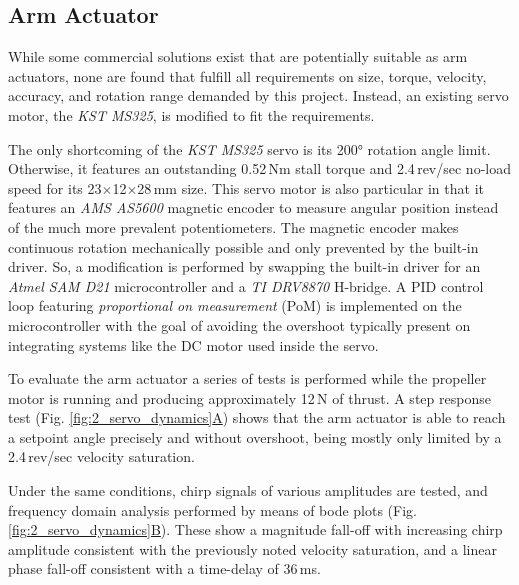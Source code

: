 \documentclass[conference]{IEEEtran}
\newcommand{\txtapprox}{\raisebox{0.5ex}{\texttildelow}}
\begin{document}
\subsection{Arm Actuator}
While some commercial solutions exist that are potentially suitable as arm actuators, none are found that fulfill all requirements on size, torque, velocity, accuracy, and rotation range demanded by this project. Instead, an existing servo motor, the \textit{KST MS325}, is modified to fit the requirements. 
\par
The only shortcoming of the \textit{KST MS325} servo is its 200° rotation angle limit. Otherwise, it features an outstanding 0.52\,Nm stall torque and 2.4\,rev/sec no-load speed for its 23$\times$12$\times$28\,mm size. This servo motor is also particular in that it features an \textit{AMS AS5600} magnetic encoder to measure angular position instead of the much more prevalent potentiometers. The magnetic encoder makes continuous rotation mechanically possible and only prevented by the built-in driver. So, a modification is performed by swapping the built-in driver for an \textit{Atmel SAM D21} microcontroller and a \textit{TI DRV8870} H-bridge. A PID control loop featuring \textit{proportional on measurement} (PoM) \cite{2017_beauregard_pom} is implemented on the microcontroller with the goal of avoiding the overshoot typically present on integrating systems like the DC motor used inside the servo.
\par
To evaluate the arm actuator a series of tests is performed while the propeller motor is running and producing approximately 12\,N of thrust. A step response test (Fig. \hyperref[fig:2_servo_dynamics]{\ref*{fig:2_servo_dynamics}A}) shows that the arm actuator is able to reach a setpoint angle precisely and without overshoot, being mostly only limited by a \txtapprox2.4\,rev/sec velocity saturation. 
\par
Under the same conditions, chirp signals of various amplitudes are tested, and frequency domain analysis performed by means of bode plots (Fig. \hyperref[fig:2_servo_dynamics]{\ref*{fig:2_servo_dynamics}B}). These show a magnitude fall-off with increasing chirp amplitude consistent with the previously noted velocity saturation, and a linear phase fall-off consistent with a time-delay of \txtapprox36\,ms.
\par

\end{document}
